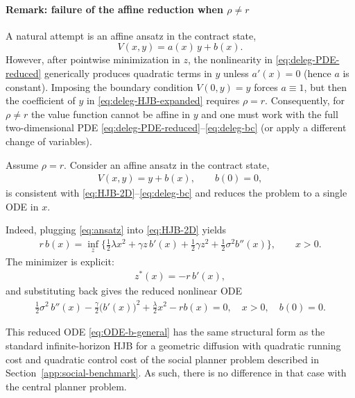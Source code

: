 \documentclass[a4paper,10pt]{article}
\theoremstyle{definition}
\theoremstyle{plain}
\numberwithin{equation}{section}
\newcommand{\hs}{\vspace{3mm}}
\begin{document}
\paragraph{Remark: failure of the affine reduction when $\rho\neq r$}
A natural attempt is an affine ansatz in the contract state,
\begin{equation}
V(x,y)=a(x)\,y+b(x).
\end{equation}
However, after pointwise minimization in $z$, the nonlinearity in \eqref{eq:deleg-PDE-reduced}
generically produces quadratic terms in $y$ unless $a'(x)=0$ (hence $a$ is constant).
Imposing the boundary condition $V(0,y)=y$ forces $a\equiv 1$, but then the coefficient of $y$
in \eqref{eq:deleg-HJB-expanded} requires $\rho=r$. Consequently, for $\rho\neq r$ the value
function cannot be affine in $y$ and one must work with the full two-dimensional PDE
\eqref{eq:deleg-PDE-reduced}--\eqref{eq:deleg-bc} (or apply a different change of variables).


\hs


Assume $\rho = r$. Consider an affine ansatz in the contract state,
\begin{align}\label{eq:ansatz}
V(x,y)=y+b(x),
\qquad b(0)=0,
\end{align}
is consistent with \eqref{eq:HJB-2D}--\eqref{eq:deleg-bc} and reduces the problem to a single ODE in $x$.

Indeed, plugging \eqref{eq:ansatz} into \eqref{eq:HJB-2D} yields
\begin{align}\label{eq:reduced-HJB}
r\,b(x) = \inf_{z} \Big\{  \frac12  \lambda  x^2 + \gamma z\,b'(x) + \frac{1}{2} \gamma  z^2 + \frac{1}{2}\sigma^2 b''(x) \Big\},
\qquad x>0.
\end{align}
The minimizer is explicit:
\begin{align} \label{eq:Z-star}
z^*(x)  =  -r\,b'(x),
\end{align}
and substituting back gives the reduced nonlinear ODE
\begin{align}\label{eq:ODE-b-general}
\frac{1}{2}\sigma^2\,b''(x)  -  \frac{\gamma}{2}\big(b'(x)\big)^2 + \frac{\lambda}{2}x^2 -  r b(x) = 0,
\quad x>0,
\quad b(0)=0.
\end{align}

This reduced ODE \eqref{eq:ODE-b-general} has the same structural form as the
standard infinite-horizon HJB for a geometric diffusion with quadratic running cost and quadratic control cost of the social planner problem described in Section~\ref{app:social-benchmark}. As such, there is no difference in that case with the central planner problem.
\end{document}
